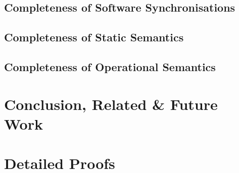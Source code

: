 \documentclass{eceasst}
\renewcommand{\covers}[1]{}
\begin{document}
\section{Completeness of Software Synchronisations}
\label{sec-compl-software-synch}


\section{Completeness of Static Semantics}
\label{sec-compl-static-sem}


\section{Completeness of Operational Semantics}
\label{sec-compl-oper-sem}


\chapter{Conclusion, Related \& Future Work}
\label{sec-conclusion}


% 
% 

\appendix

\chapter{Detailed Proofs}





\printindex

\covers{}
\end{document}
